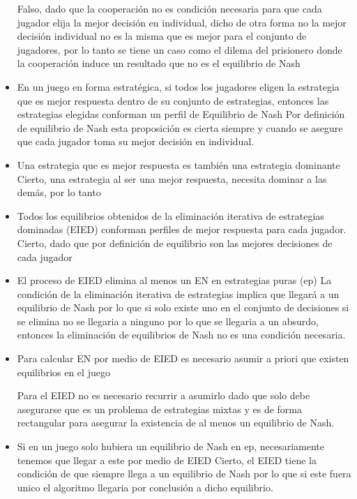 \documentclass{article}
\begin{document}
\begin{itemize}
        Falso, dado que la cooperación no es condición necesaria para que cada jugador elija la mejor decisión en individual, dicho de otra forma no la mejor decisión individual no es la misma que es mejor para el conjunto de jugadores, por lo tanto se tiene un caso como el dilema del prisionero donde la cooperación induce un resultado que no es el equilibrio de Nash
    \item En un juego en forma estratégica, si todos los jugadores eligen la estrategia que es mejor respuesta dentro de su conjunto de estrategias, entonces las estrategias elegidas conforman un perfil de Equilibrio de Nash
        Por definición de equilibrio de Nash esta proposición es cierta siempre y cuando se asegure que cada jugador toma su mejor decisión en individual.
    \item Una estrategia que es mejor respuesta es también una estrategia dominante
        Cierto, una estrategia al ser una mejor respuesta, necesita dominar a las demás, por lo tanto 
    \item Todos los equilibrios obtenidos de la eliminación iterativa de estrategias dominadas (EIED) conforman perfiles de mejor respuesta para cada jugador.
        Cierto, dado que por definición de equilibrio son las mejores decisiones de cada jugador
    \item El proceso de EIED elimina al menos un EN en estrategias puras (ep)
        La condición de la eliminación iterativa de estrategias implica que llegará a un equilibrio de Nash por lo que si solo existe uno en el conjunto de decisiones si se elimina no se llegaria a ninguno por lo que se llegaria a un absurdo, entonces la eliminación de equilibrios de Nash no es una condición necesaria.
    \item Para calcular EN por medio de EIED es necesario asumir a priori que existen equilibrios en el juego
        
        Para el EIED no es necesario recurrir a asumirlo dado que solo debe asegurarse que es un problema de estrategias mixtas y es de forma rectangular para asegurar la existencia de al menos un equilibrio de Nash.
        
    \item   Si en un juego solo hubiera un equilibrio de Nash en ep, necesariamente tenemos que llegar a este por medio de EIED
        Cierto, el EIED tiene la condición de que siempre llega a un equilibrio de Nash por lo que si este fuera unico el algoritmo llegaria por conclusión a dicho equilibrio.
    
    
\end{itemize}
\end{document}

